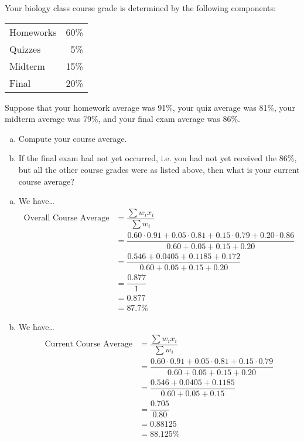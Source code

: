 \documentclass[11pt,letterpaper]{article}
\begin{document}
\newpage



 Your biology class course grade is determined by the following components: \par
	\begin{table}[h]
	\centering
	\begin{tabular}{lr}
	Homeworks & 60\% \\
	Quizzes & 5\% \\
	Midterm & 15\% \\
	Final & 20\% \\
	\end{tabular}
	\end{table} \par
Suppose that your homework average was 91\%, your quiz average was 81\%, your midterm average was 79\%, and your final exam average was 86\%.
	\begin{enumerate}[(a)]
	\item Compute your course average.
	\item If the final exam had not yet occurred, i.e. you had not yet received the 86\%, but all the other course grades were as listed above, then what is your current course average?
	\end{enumerate} \pspace

\sol 
\begin{enumerate}[(a)]
\item We have\dots
	\[
	\begin{aligned}
	\text{Overall Course Average}&= \dfrac{\sum w_i x_i}{\sum w_i} \\[0.3cm]
	&= \dfrac{0.60 \cdot 0.91 + 0.05 \cdot 0.81 + 0.15 \cdot 0.79 + 0.20 \cdot 0.86}{0.60 + 0.05 + 0.15 + 0.20} \\[0.3cm]
	&= \dfrac{0.546 + 0.0405 + 0.1185 + 0.172}{0.60 + 0.05 + 0.15 + 0.20} \\[0.3cm]
	&= \dfrac{0.877}{1} \\[0.3cm]
	&= 0.877 \\[0.3cm]
	&= 87.7\%
	\end{aligned}
	\] \pspace

\item We have\dots
	\[
	\begin{aligned}
	\text{Current Course Average}&= \dfrac{\sum w_i x_i}{\sum w_i} \\[0.3cm]
	&= \dfrac{0.60 \cdot 0.91 + 0.05 \cdot 0.81 + 0.15 \cdot 0.79}{0.60 + 0.05 + 0.15 + 0.20} \\[0.3cm]
	&= \dfrac{0.546 + 0.0405 + 0.1185}{0.60 + 0.05 + 0.15} \\[0.3cm]
	&= \dfrac{0.705}{0.80} \\[0.3cm]
	&= 0.88125 \\[0.3cm]
	&= 88.125\%
	\end{aligned}
	\]  
\end{enumerate}
\end{document}

